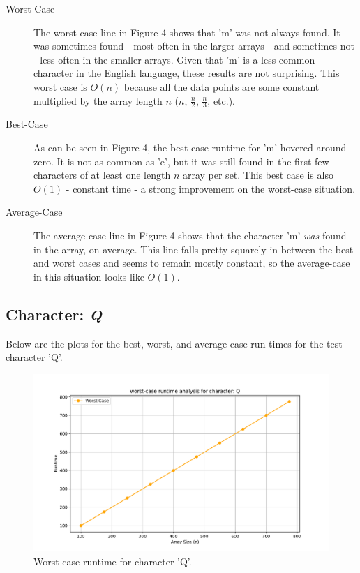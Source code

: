 \documentclass{article}
\begin{document}
\begin{description}
    \item[Worst-Case] The worst-case line in Figure 4 shows that 'm' was not always found. It was sometimes found - most often in the larger arrays - and sometimes not - less often in the smaller arrays. Given that 'm' is a less common character in the English language, these results are not surprising. This worst case is $O(n)$ because all the data points are some constant multiplied by the array length $n$ ($n$, $\frac{n}{2}$, $\frac{n}{3}$, etc.).
    \item[Best-Case] As can be seen in Figure 4, the best-case runtime for 'm' hovered around zero. It is not as common as 'e', but it was still found in the first few characters of at least one length $n$ array per set. This best case is also $O(1)$ - constant time - a strong improvement on the worst-case situation. 
    \item[Average-Case] The average-case line in Figure 4 shows that the character 'm' \textit{was} found in the array, on average. This line falls pretty squarely in between the best and worst cases and seems to remain mostly constant, so the average-case in this situation looks like $O(1)$. 
\end{description}

\subsection{Character: \textit{Q}}
Below are the plots for the best, worst, and average-case run-times for the test character 'Q'.
	
	\begin{figure}[H]
		\centering
		\includegraphics[width=\textwidth]{runtime_analysis_worst_Q.pdf}
		\caption{Worst-case runtime for character 'Q'.}
	\end{figure}
\end{document}
